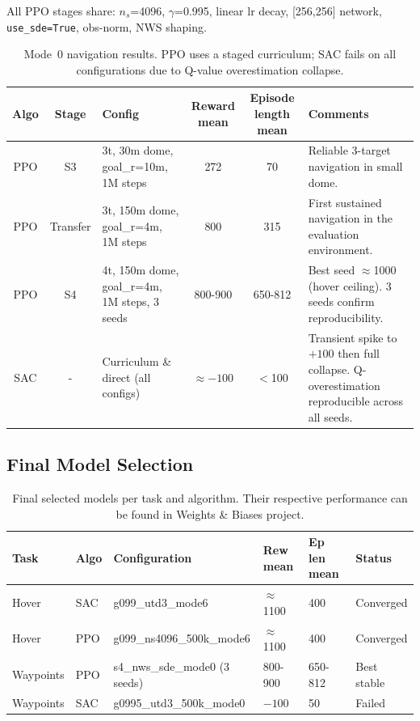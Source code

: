 \documentclass[11pt,a4paper]{article}
\begin{document}
All PPO stages share: $n_s$=4096, $\gamma$=0.995, linear lr decay, [256,256] network, \texttt{use\_sde=True}, obs-norm, NWS shaping.

\begin{table}[H]
\centering
\small
\renewcommand{\arraystretch}{1.35}
\begin{tabular}{@{} c c >{\centering\arraybackslash}p{3.2cm} c c >{\centering\arraybackslash}p{3.8cm} @{}}
\toprule
\textbf{Algo} & \textbf{Stage} & \textbf{Config} & \textbf{Reward mean} & \textbf{Episode length mean} & \textbf{Comments} \\
\midrule
PPO & S3 & 3t, 30m dome, goal\_r=10m, 1M steps & 272 & 70 &
  Reliable 3-target navigation in small dome. \\
PPO & Transfer & 3t, 150m dome, goal\_r=4m, 1M steps & 800 & 315 &
  First sustained navigation in the evaluation environment. \\
PPO & S4 & 4t, 150m dome, goal\_r=4m, 1M steps, 3 seeds & 800-900 & 650-812 &
  Best seed $\approx$1000 (hover ceiling). 3 seeds confirm reproducibility. \\
\midrule
SAC & - & Curriculum \& direct (all configs) & $\approx -100$ & $<$100 &
  Transient spike to $+100$ then full collapse. Q-overestimation reproducible across all seeds. \\
\bottomrule
\end{tabular}
\caption{Mode~0 navigation results. PPO uses a staged curriculum; SAC fails on all configurations due to Q-value overestimation collapse.}
\label{tab:wp-mode0}
\end{table}

\subsection{Final Model Selection}

\begin{table}[H]
\centering
\begin{tabular}{llllll}
\toprule
Task & Algo & Configuration & Rew mean & Ep len mean & Status \\
\midrule
Hover & SAC & g099\_utd3\_mode6  & $\approx$1100 & 400 & Converged \\
Hover & PPO & g099\_ns4096\_500k\_mode6 & $\approx$1100 & 400 & Converged \\
Waypoints & PPO & s4\_nws\_sde\_mode0 (3 seeds) & 800-900 & 650-812 & Best stable \\
Waypoints & SAC & g0995\_utd3\_500k\_mode0 & $-100$ & 50 & Failed \\
\bottomrule
\end{tabular}
\caption{Final selected models per task and algorithm. Their respective performance can be found in Weights \& Biases project.}
\end{table}
\end{document}
